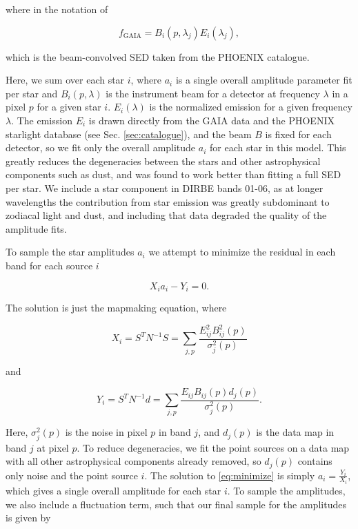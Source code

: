 \documentclass{aa}
\begin{document}
where in the notation of \cite{CG02_01} 

\begin{equation}
f_{\mathrm{GAIA}} = B_i(p, \lambda_j) E_i(\lambda_j),
\label{eq:datamodel}
\end{equation}

which is the beam-convolved SED taken from the PHOENIX catalogue.

Here, we sum over each star $i$, where $a_i$ is a single overall amplitude parameter fit per star and $B_i(p, \lambda)$ is the instrument beam for a detector at frequency $\lambda$ in a pixel $p$ for a given star $i$. $E_i(\lambda)$ is the normalized emission for a given frequency $\lambda$. The emission $E_i$ is drawn directly from the GAIA data and the PHOENIX starlight database (see Sec. \ref{sec:catalogue}), and the beam $B$ is fixed for each detector, so we fit only the overall amplitude $a_i$ for each star in this model. This greatly reduces the degeneracies between the stars and other astrophysical components such as dust, and was found to work better than fitting a full SED per star. We include a star component in DIRBE bands 01-06, as at longer wavelengths the contribution from star emission was greatly subdominant to zodiacal light and dust, and including that data degraded the quality of the amplitude fits. 

To sample the star amplitudes $a_i$ we attempt to minimize the residual in each band for each source $i$

\begin{equation}
\label{eq:minimize}
X_ia_i - Y_i = 0.
\end{equation}

The solution is just the mapmaking equation, where

\begin{equation}
X_i = S^T N^{-1} S = \sum_{j,p}\frac{E_{ij}^2 B^2_{ij}(p)}{\sigma_j^2(p)} 
\end{equation}

and

\begin{equation}
Y_i = S^TN^{-1}d = \sum_{j,p} \frac{E_{ij}B_{ij}(p) d_j(p)}{\sigma_j^2(p)}.
\end{equation}

Here, $\sigma_j^2(p)$ is the noise in pixel $p$ in band $j$, and $d_j(p)$ is the data map in band $j$ at pixel $p$. To reduce degeneracies, we fit the point sources on a data map with all other astrophysical components already removed, so $d_j(p)$ contains only noise and the point source $i$. The solution to \ref{eq:minimize} is simply $a_i = \frac{Y_i}{X_i}$, which gives a single overall amplitude for each star $i$. To sample the amplitudes, we also include a fluctuation term, such that our final sample for the amplitudes is given by
\end{document}
